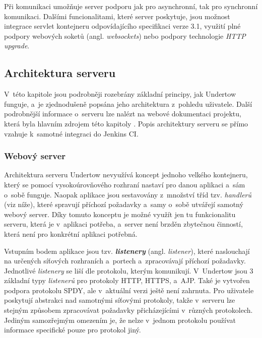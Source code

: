             Při komunikaci umožňuje server podporu jak pro asynchronní, tak
            pro synchronní komunikaci.
            Dalšími funcionalitami, které server poskytuje, jsou možnost integrace
            servlet kontejneru odpovídajícího specifikaci verze 3.1,
            využití plné podpory webových soketů (angl. \emph{websockets}) nebo 
            podpory technologie \emph{HTTP upgrade}.

        \subsection{Architektura serveru}
            V~této kapitole jsou podrobněji rozebrány základní principy, jak Undertow funguje, 
            a~je zjednodušeně popsána jeho architektura z~pohledu uživatele. Další podrobnější informace o~serveru 
            lze nalézt na webové dokumentaci projektu, která byla hlavním zdrojem této kapitoly \cite{undertowDocs}.
            Popis architektury serveru se přímo vzahuje k~samotné integraci do Jenkins CI.

            \subsubsection{Webový server}
                Architektura serveru Undertow nevyužívá koncept jednoho velkého kontejneru, který se pomocí vysokoúrovňového rozhraní nastaví 
                pro danou aplikaci a~sám o~sobě funguje. Naopak aplikace jsou sestavovány z~množství tříd tzv. \emph{handlerů} 
                (viz níže), které spravují příchozí požadavky a~samy o~sobě utvářejí samotný webový server. 
                Díky tomuto konceptu je možné využít jen tu funkcionalitu serveru, která je v~aplikaci potřeba, a~server
                není brzděn zbytečnou činností, která není pro konkrétní aplikaci potřebná. 

                Vstupním bodem aplikace jsou tzv. \textbf{\emph{listenery}} (angl. \emph{listener}), které naslouchají na určených síťových
                rozhraních a~portech a~zpracovávají příchozí požadavky. Jednotlivé \emph{listenery} se liší dle protokolu, kterým komunikují.
                V~Undertow jsou 3 základní typy \emph{listenerů}
                pro protokoly HTTP, HTTPS, a~AJP. Také je vytvořen podpora protokolu SPDY, ale v~aktuální verzi ještě není zahrnuta. 
                Pro uživatele poskytují abstrakci nad samotnými síťovými protokoly, takže v~serveru lze stejným způsobem zpracovávat
                požadavky přicházejícími v~různých protokolech. Jediným samozřejmým omezením je, že nelze v~jednom protokolu
                používat informace specifické pouze pro protokol jiný. 
                
